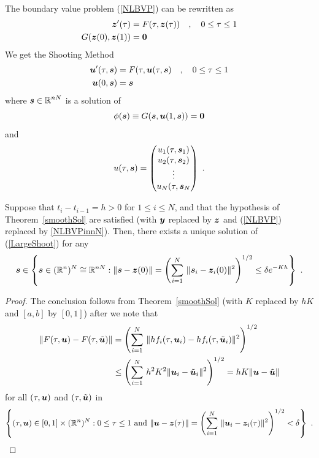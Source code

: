 The boundary value problem (\ref{NLBVP}) can be rewritten as
\begin{equation}\label{NLBVPinnN}
\begin{split}
\bm{z}'(\tau) &= F(\tau,\bm{z}(\tau)) \quad , \quad 0 \leq \tau
\leq 1 \\
G(\bm{z}(0), \bm{z}(1)) &= \bm{0}
\end{split}
\end{equation}
We get the Shooting Method
\begin{equation} \label{LargeShoot}
\begin{split}
\bm{u}'(\tau,\bm{s}) &= F(\tau,\bm{u}(\tau,\bm{s}) \quad ,
\quad 0 \leq \tau \leq 1 \\
\bm{u}(0,\bm{s}) &= \bm{s}
\end{split}
\end{equation}
where $\displaystyle \bm{s} \in \mathbb{R}^{nN}$ is a solution of
\begin{equation} \label{LargeIter}
\phi(\bm{s}) \equiv G(\bm{s},\bm{u}(1,\bm{s})) = \bm{0}
\end{equation}
and
\[
u(\tau,\bm{s}) = \begin{pmatrix}
u_1(\tau,\bm{s}_1) \\
u_2(\tau,\bm{s}_2) \\
\vdots \\
u_N(\tau,\bm{s}_N
\end{pmatrix} \ .
\]

\begin{theorem}
Suppose that $t_i - t_{i-1} = h > 0$ for $1\leq i \leq N$,
and that the hypothesis of Theorem~\ref{smoothSol} are satisfied
(with $\bm{y}$ replaced by $\bm{z}$ and (\ref{NLBVP}) replaced by 
\ref{NLBVPinnN}).  Then, there exists a unique solution of
(\ref{LargeShoot}) for any
\[
\bm{s} \in \left\{ \bm{s} \in (\mathbb{R}^n)^N \cong \mathbb{R}^{nN} :
\| \bm{s} - \bm{z}(0) \| = \left( \sum_{i=1}^N
\,\| \bm{s}_i - \bm{z}_i(0)  \|^2 \right)^{1/2} \leq
\delta e^{-K h} \right\} \ .
\]
\end{theorem}

\begin{proof}
The conclusion follows from Theorem~\ref{smoothSol} (with $K$ replaced
by $hK$ and $[a,b]$ by $[0,1]$) after we note that
\begin{align*}
\| F(\tau,\bm{u}) - F(\tau,\tilde{\bm{u}}) \|
& = \left( \sum_{i=1}^N\, \| h f_i(\tau,\bm{u}_i) -
h f_i(\tau,\tilde{\bm{u}}_i) \|^2 \right)^{1/2} \\
&\leq \left( \sum_{i=1}^N\, h^2 K^2
\| \bm{u}_i - \tilde{\bm{u}}_i \|^2 \right)^{1/2}
= h K \| \bm{u} - \tilde{\bm{u}} \|
\end{align*}
for all $(\tau,\bm{u})$ and $(\tau,\tilde{\bm{u}})$ in
\[
\left\{ (\tau,\bm{u}) \in [0,1]\times (\mathbb{R}^n)^N :
0 \leq \tau \leq 1 \text{ and }
\| \bm{u} - \bm{z}(\tau) \| = \left(
\sum_{i=1}^N \,\| \bm{u}_i - \bm{z}_i(\tau) \|^2 \right)^{1/2} <
\delta \right\} \ .  \qedhere
\]
\end{proof}

